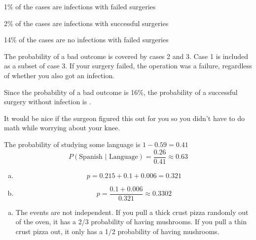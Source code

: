 \documentclass[letterpaper, landscape]{exam}
\begin{document}
\begin{description}
\begin{enumerate}[(a)]
        \end{enumerate}

      \item[32]
        \begin{enumerate*}
          \item 1\% of the cases are infections with failed surgeries
          \item 2\% of the cases are infections with successful surgeries
          \item 14\% of the cases are no infections with failed surgeries
        \end{enumerate*}

        The probability of a bad outcome is covered by cases 2 and 3. Case 1 is
        included as a subset of case 3. If your surgery failed, the operation
        was a failure, regardless of whether you also got an infection.

        Since the probability of a bad outcome is 16\%, the probability of a
        successful surgery without infection is .

        It would be nice if the surgeon figured this out for you so you didn't
        have to do math while worrying about your knee.


      \item[34]
        The probability of studying some language is $1 - 0.59 = 0.41$
        \[
          P(\text{Spanish } | \text{ Language}) = \frac{0.26}{0.41} 
            \approx \boxed{ 0.63 }
        \]

      \item[35]
        \begin{enumerate}[(a)]
          \item 
            \[
              p = 0.215 + 0.1 + 0.006 = \boxed{ 0.321 }
            \]

          \item
            \[
              p = \frac{0.1 + 0.006}{0.321} \approx \boxed{ 0.3302 }
            \]
        \end{enumerate}

      \item[36]
        \begin{enumerate}[(a)]
          \item The events are not independent. If you pull a thick crust pizza
            randomly out of the oven, it has a 2/3 probability of having
            mushrooms. If you pull a thin crust pizza out, it only has a 1/2
            probability of having mushrooms.


\end{enumerate}
\end{description}
\end{document}
